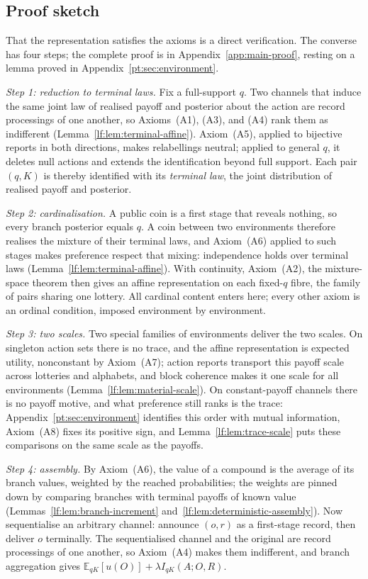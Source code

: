 \documentclass[11pt,a4paper]{article}
\theoremstyle{definition}
\newcommand{\E}{\mathbb E}
\newcommand{\I}{I}
\newcommand{\1}{\mathbf 1}
\begin{document}
\subsection{Proof sketch}
That the representation satisfies the axioms is a direct verification.  The converse has four steps; the
complete proof is in Appendix~\ref{app:main-proof}, resting on a lemma proved in
Appendix~\ref{pt:sec:environment}.

\emph{Step 1: reduction to terminal laws.}  Fix a full-support $q$.  Two channels that induce the same joint law
of realised payoff and posterior about the action are record processings of one another, so Axioms~\textup{(A1)},
\textup{(A3)}, and \textup{(A4)} rank them as indifferent (Lemma~\ref{lf:lem:terminal-affine}).
Axiom~\textup{(A5)}, applied to bijective reports in both directions, makes relabellings neutral; applied to
general $q$, it deletes null actions and extends the identification beyond full support.  Each pair $(q,K)$ is
thereby identified with its \emph{terminal law}, the joint distribution of realised payoff and posterior.

\emph{Step 2: cardinalisation.}  A public coin is a first stage that reveals nothing, so every branch posterior
equals $q$.  A coin between two environments therefore realises the mixture of their terminal laws, and
Axiom~\textup{(A6)} applied to such stages makes preference respect that mixing: independence holds over
terminal laws (Lemma~\ref{lf:lem:terminal-affine}).  With continuity, Axiom~\textup{(A2)}, the mixture-space
theorem then gives an affine representation on each fixed-$q$ fibre, the family of pairs sharing one lottery.
All cardinal content enters here; every other axiom is an ordinal condition, imposed environment by environment.

\emph{Step 3: two scales.}  Two special families of environments deliver the two scales.  On singleton action
sets there is no trace, and the affine representation is expected utility, nonconstant by
Axiom~\textup{(A7)}; action reports transport this payoff scale across lotteries and alphabets, and block
coherence makes it one scale for all environments (Lemma~\ref{lf:lem:material-scale}).  On constant-payoff
channels there is no payoff motive, and what preference still ranks is the trace:
Appendix~\ref{pt:sec:environment} identifies this order with mutual information, Axiom~\textup{(A8)} fixes its
positive sign, and Lemma~\ref{lf:lem:trace-scale} puts these comparisons on the same scale as the payoffs.

\emph{Step 4: assembly.}  By Axiom~\textup{(A6)}, the value of a compound is the average of its branch values,
weighted by the reached probabilities; the weights are pinned down by comparing branches with terminal payoffs
of known value (Lemmas~\ref{lf:lem:branch-increment} and~\ref{lf:lem:deterministic-assembly}).  Now
sequentialise an arbitrary channel: announce $(o,r)$ as a first-stage record, then deliver $o$ terminally.  The
sequentialised channel and the original are record processings of one another, so Axiom~\textup{(A4)} makes them indifferent, and branch
aggregation gives $\E_{qK}[u(O)]+\lambda\I_{qK}(A;O,R)$.
\end{document}
